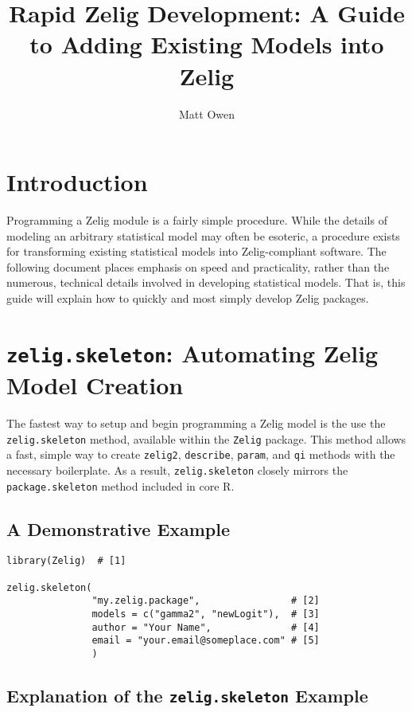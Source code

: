\documentclass{article}
\title{Rapid Zelig Development: A Guide to Adding Existing Models into Zelig}
\author{Matt Owen}
\newcommand{\code}[1]{{\tt #1}}
\begin{document}
\maketitle


\section{Introduction}

Programming a Zelig module is a fairly simple procedure. While the details of modeling an arbitrary statistical model may often be esoteric, a procedure exists for transforming existing statistical models into Zelig-compliant software. The following document places emphasis on speed and practicality, rather than the numerous, technical details involved in developing statistical models. That is, this guide will explain how to quickly and most simply develop Zelig packages.

\section{\code{zelig.skeleton}: Automating Zelig Model Creation}

The fastest way to setup and begin programming a Zelig model is the use the \code{zelig.skeleton} method, available within the \code{Zelig} package. This method allows a fast, simple way to create \code{zelig2}, \code{describe}, \code{param}, and \code{qi} methods with the necessary boilerplate. As a result, \code{zelig.skeleton} closely mirrors the \code{package.skeleton} method included in core R.

\subsection{A Demonstrative Example}

\begin{verbatim}
library(Zelig)  # [1]

zelig.skeleton(
               "my.zelig.package",                # [2]
               models = c("gamma2", "newLogit"),  # [3]
               author = "Your Name",              # [4]
               email = "your.email@someplace.com" # [5]
               )
\end{verbatim}

\subsection{Explanation of the \code{zelig.skeleton} Example}
\end{document}
